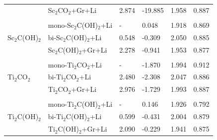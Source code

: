 \begin{table}[ht]
\begin{tabularx}{\textwidth}{XXXXXX}
              & Sc$_2$CO$_2$+Gr+Li     & 2.874              & -19.885 & 1.958  & 0.887 \\ 
              & & & & \\
\multirow{3}{*}{Sc$_2$C(OH)$_2$} &mono-Sc$_2$C(OH)$_2$+Li                                            & -                        & 0.048                          & 1.918                     & 0.869                        \\
              &bi-Sc$_2$C(OH)$_2$+Li                                              & 0.548                     & -0.309                         & 2.050                     & 0.885                        \\
              &Sc$_2$C(OH)$_2$+Gr+Li                                                   & 2.278                   & -0.941                         & 1.953                     & 0.877                        \\ 
              & & & & \\
\multirow{3}{*}{Ti$_2$CO$_2$}    &mono-Ti$_2$CO$_2$+Li                                            & -                         & -1.870                         & 1.994                     & 0.912                        \\
              &bi-Ti$_2$CO$_2$+Li                                                 & 2.480                   & -2.308                         & 2.047                     & 0.886                        \\
              &Ti$_2$CO$_2$+Gr+Li                                                   & 2.976                   & -1.729                         & 1.993                     & 0.887                        \\ 
              & & & & \\
\multirow{3}{*}{Ti$_2$C(OH)$_2$} &mono-Ti$_2$C(OH)$_2$+Li                                              & -                                     & 0.146                          & 1.926                     & 0.792                        \\
              &bi-Ti$_2$C(OH)$_2$+Li                                              & 0.599                   & -0.431                         & 2.004                     & 0.879                        \\
              &Ti$_2$C(OH)$_2$+Gr+Li                                                  & 2.090                   & -0.229                         & 1.941                     & 0.875                        \\ 

\end{tabularx}
\end{table}

